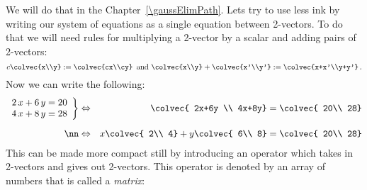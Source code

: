 %
We will do that in the Chapter~\ref{\gaussElimPath}. Lets try to use less ink by writing our system of  equations as a single equation between 2-vectors.
To do that we will need rules for multiplying a 2-vector by a scalar and adding pairs of 2-vectors:
\[
c\colvec{x\\y}:=\colvec{cx\\cy}\, \mbox{ and } \colvec{x\\y}+\colvec{x'\\y'}:=\colvec{x+x'\\y+y'}\, .
\]
Now we can write the following:
\begin{align*}
   \left.
\begin{array}{lr}
   	2\, x + 6\, y  =  20 \\
	4\, x + 8\, y  =  28
     \end{array}
   \right\} 
& \Leftrightarrow&    \colvec{ 2x+6y \\ 4x+8y}  =\colvec{ 20\\ 28}\\[2mm] \nn 
&\Leftrightarrow&
   x \colvec{ 2\\ 4} + y \colvec{ 6\\ 8} =\colvec{ 20\\ 28} 
\end{align*}
This can be made more compact still by introducing an operator which takes in 2-vectors and gives out 2-vectors. This operator is denoted by an array of numbers that  is called a {\itshape matrix}:
